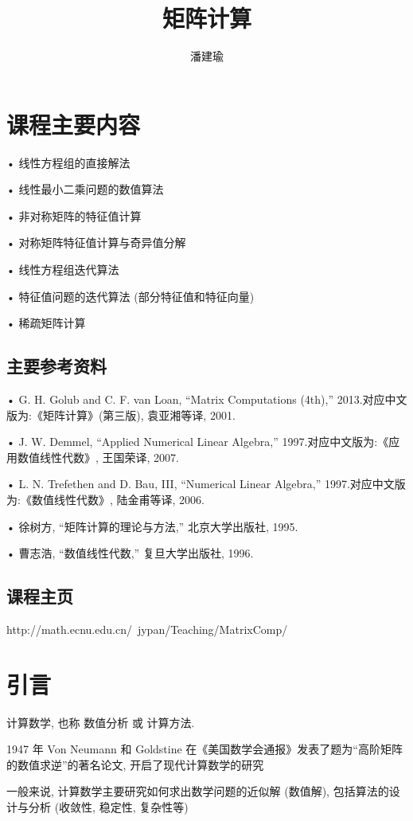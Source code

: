 \documentclass[12pt,a4paper]{article}
\title{矩阵计算}
\author{潘建瑜}
\begin{document}
\maketitle
\newpage
\section{课程主要内容}

• 线性方程组的直接解法

• 线性最小二乘问题的数值算法

• 非对称矩阵的特征值计算

• 对称矩阵特征值计算与奇异值分解

• 线性方程组迭代算法

• 特征值问题的迭代算法 (部分特征值和特征向量)

• 稀疏矩阵计算

 \subsection*{主要参考资料}

• G. H. Golub and C. F. van Loan, “Matrix Computations (4th),” 2013.对应中文版为:《矩阵计算》(第三版), 袁亚湘等译, 2001.

• J. W. Demmel, “Applied Numerical Linear Algebra,” 1997.对应中文版为:《应用数值线性代数》, 王国荣译, 2007.

• L. N. Trefethen and D. Bau, III, “Numerical Linear Algebra,” 1997.对应中文版为:《数值线性代数》, 陆金甫等译, 2006.

• 徐树方, “矩阵计算的理论与方法,” 北京大学出版社, 1995.

• 曹志浩, “数值线性代数,” 复旦大学出版社, 1996.

\subsection*{课程主页}

http://math.ecnu.edu.cn/~jypan/Teaching/MatrixComp/

\newpage
\section{引言}
计算数学, 也称 数值分析 或 计算方法.

1947 年 Von Neumann 和 Goldstine 在《美国数学会通报》发表了题为“高阶矩阵的数值求逆”的著名论文, 开启了现代计算数学的研究

一般来说, 计算数学主要研究如何求出数学问题的近似解 (数值解), 包括算法的设计与分析 (收敛性, 稳定性, 复杂性等)
\end{document}
